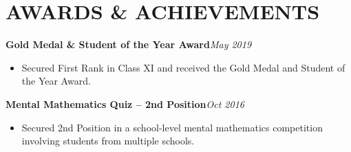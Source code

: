 \documentclass[10pt,letterpaper]{article}
\newcommand{\entry}[2]{\textbf{#1}\hfill\textit{#2}\par}
\begin{document}
\section*{AWARDS \& ACHIEVEMENTS}

\entry{Gold Medal \& Student of the Year Award}{May 2019}
\begin{itemize}
  \item Secured First Rank in Class XI and received the Gold Medal and Student of the Year Award.
\end{itemize}

\vspace{3pt}
\entry{Mental Mathematics Quiz -- 2nd Position}{Oct 2016}
\begin{itemize}
  \item Secured 2nd Position in a school-level mental mathematics competition involving students from multiple schools.
\end{itemize}
\end{document}
